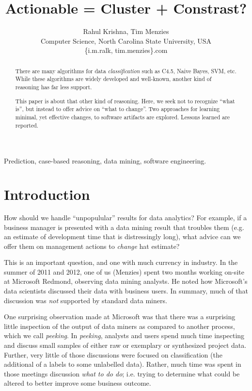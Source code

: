 \documentclass[conference]{IEEEtran}
\title{Actionable = Cluster + Constrast?}
\author{Rahul Krishna, Tim Menzies\\
        Computer Science, North Carolina State University, USA\\
       \{i.m.ralk, tim.menzies\}\@gmail.com
       
}
\begin{document}
  \maketitle
    \begin{abstract}
 There are many
    algorithms for data {\em classification} such as  C4.5, Naive Bayes, SVM, etc. While these algorithms are widely developed and well-known, another kind
    of reasoning has far less support.

This paper is about that other kind of reasoning. Here, we seek not
    to recognize ``what is'', but instead to offer advice on ``what to change''.
Two approaches for learning minimal, yet effective changes, to software
artifacts are explored. Lessons learned are reported.
  \end{abstract}
  \begin{IEEEkeywords}
Prediction, case-based reasoning, data mining, software engineering.
  \end{IEEEkeywords}

\section{Introduction} 
How should we handle ``unpopulular'' results
    for data analytics? For example, if a business manager is presented
    with a data mining result that troubles them (e.g. an estimate of
    development time that is distressingly long), what advice
    can we offer them on management actions to {\em change} hat estimate?

This is an important question, and one with much currency in industry.
In the summer of 2011 and 2012, one of us (Menzies) spent two months
working on-site at Microsoft Redmond,
observing data mining analysts.  He
noted how Microsoft's data scientists
discussed their data with  business users. In summary, much
of that discussion was {\em not} supported by standard data miners.

One surprising observation made at Microsoft  was that
there was a surprising little
inspection of the output of data miners as compared to another process, which we call {\em peeking}.
In {\em peeking}, analysts and users spend much time
inspecting and discuss small samples of either raw or exemplary or synthesized project data.  Further, very little of those discussions were  focused on classification
(the additional of a labels to some unlabelled data). Rather, much time
was spent in those meetings discussion {\em what to do do}; i.e. trying
to determine what could be altered to better improve some business outcome.
\end{document}
